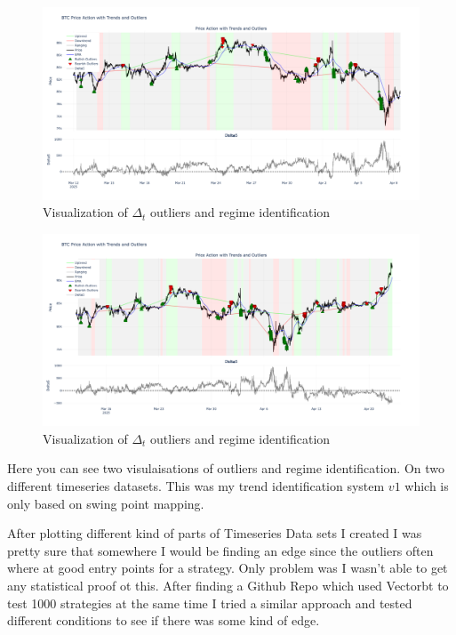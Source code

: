 \documentclass[12pt]{article}
\begin{document}
\begin{figure}[H]
  \centering
  \includegraphics[width=\textwidth]{imgs/plotting_of_my_idea.png}
  \caption{Visualization of $\Delta_t$ outliers and regime identification}
\end{figure}
\begin{figure}[H]
  \centering
  \includegraphics[width=\textwidth]{imgs/v2_plotting my idea.png}
  \caption{Visualization of $\Delta_t$ outliers and regime identification}
\end{figure}

Here you can see two visulaisations of outliers and regime identification. On two different timeseries datasets. This was my trend identification system $v1$ which is only based on swing point mapping.






After plotting different kind of parts of Timeseries Data sets I created I was pretty sure that somewhere I would be finding an edge since the outliers often where at good entry points for a strategy. Only problem was I wasn't able to get any statistical proof ot this.
After finding a Github Repo which used Vectorbt to test 1000 strategies at the same time I tried a similar approach and tested different conditions to see if there was some kind of edge.
\end{document}
